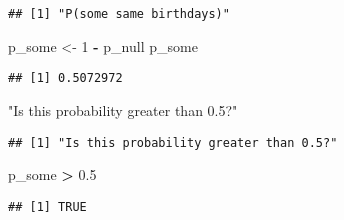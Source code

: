 \documentclass[]{article}
\newenvironment{Shaded}{\begin{snugshade}}{\end{snugshade}}
\newcommand{\DecValTok}[1]{\textcolor[rgb]{0.00,0.00,0.81}{#1}}
\newcommand{\FloatTok}[1]{\textcolor[rgb]{0.00,0.00,0.81}{#1}}
\newcommand{\NormalTok}[1]{#1}
\newcommand{\OperatorTok}[1]{\textcolor[rgb]{0.81,0.36,0.00}{\textbf{#1}}}
\newcommand{\StringTok}[1]{\textcolor[rgb]{0.31,0.60,0.02}{#1}}
\begin{document}
\begin{verbatim}
## [1] "P(some same birthdays)"
\end{verbatim}

\begin{Shaded}
\begin{Highlighting}[]
\NormalTok{p_some <-}\StringTok{ }\DecValTok{1} \OperatorTok{-}\StringTok{ }\NormalTok{p_null}
\NormalTok{p_some}
\end{Highlighting}
\end{Shaded}

\begin{verbatim}
## [1] 0.5072972
\end{verbatim}

\begin{Shaded}
\begin{Highlighting}[]
\StringTok{"Is this probability greater than 0.5?"}
\end{Highlighting}
\end{Shaded}

\begin{verbatim}
## [1] "Is this probability greater than 0.5?"
\end{verbatim}

\begin{Shaded}
\begin{Highlighting}[]
\NormalTok{p_some }\OperatorTok{>}\StringTok{ }\FloatTok{0.5}
\end{Highlighting}
\end{Shaded}

\begin{verbatim}
## [1] TRUE
\end{verbatim}
\end{document}
